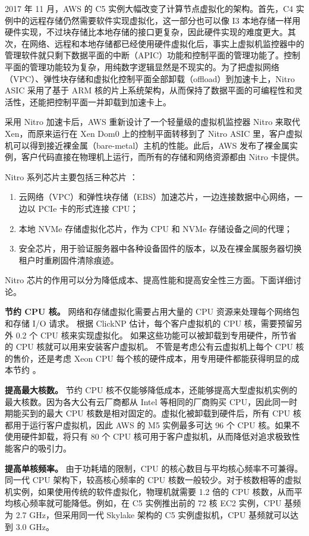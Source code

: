 2017 年 11 月，AWS 的 C5 实例大幅改变了计算节点虚拟化的架构。首先，C4 实例中的远程存储仍然需要软件实现虚拟化，这一部分也可以像 I3 本地存储一样用硬件实现，不过块存储比本地存储的接口更复杂，因此硬件实现的难度更大。其次，在网络、远程和本地存储都已经使用硬件虚拟化后，事实上虚拟机监控器中的管理软件就只剩下数据平面的中断（APIC）功能和控制平面的管理功能了。控制平面的管理功能较为复杂，用纯数字逻辑显然是不现实的。为了把虚拟网络（VPC）、弹性块存储和虚拟化控制平面全部卸载（offload）到加速卡上，Nitro ASIC 采用了基于 ARM 核的片上系统架构，从而保持了数据平面的可编程性和灵活性，还能把控制平面一并卸载到加速卡上。

采用 Nitro 加速卡后，AWS 重新设计了一个轻量级的虚拟机监控器 Nitro 来取代 Xen，而原来运行在 Xen Dom0 上的控制平面转移到了 Nitro ASIC 里，客户虚拟机可以得到接近裸金属（bare-metal）主机的性能。此后，AWS 发布了裸金属实例，客户代码直接在物理机上运行，而所有的存储和网络资源都由 Nitro 卡提供。

Nitro 系列芯片主要包括三种芯片 \cite{nitro-blog,nitro-talk,nitro-web}：
\begin{enumerate}
	\item 云网络（VPC）和弹性块存储（EBS）加速芯片，一边连接数据中心网络，一边以 PCIe 卡的形式连接 CPU；
	\item 本地 NVMe 存储虚拟化芯片，作为 CPU 和 NVMe 存储设备之间的代理；
	\item 安全芯片，用于验证服务器中各种设备固件的版本，以及在裸金属服务器切换租户时重刷固件清除痕迹。
\end{enumerate}

Nitro 芯片的作用可以分为降低成本、提高性能和提高安全性三方面。下面详细讨论。

\textbf{节约 CPU 核。}
网络和存储虚拟化需要占用大量的 CPU 资源来处理每个网络包和存储 I/O 请求。
根据 ClickNP \cite{li2016clicknp} 估计，每个客户虚拟机的 CPU 核，需要预留另外 0.2 个 CPU 核来实现虚拟化。
如果这些功能可以被卸载到专用硬件，所节省的 CPU 核就可以用来安装客户虚拟机。
不管是考虑公有云虚拟机上每个 CPU 核的售价，还是考虑 Xeon CPU 每个核的硬件成本，用专用硬件都能获得明显的成本节约 \cite{smartnic}。

\textbf{提高最大核数。}
节约 CPU 核不仅能够降低成本，还能够提高大型虚拟机实例的最大核数。因为各大公有云厂商都从 Intel 等相同的厂商购买 CPU，因此同一时期能买到的最大 CPU 核数是相对固定的。虚拟化被卸载到硬件后，所有 CPU 核都用于运行客户虚拟机，因此 AWS 的 M5 实例最多可达 96 个 CPU 核。如果不使用硬件卸载，将只有 80 个 CPU 核可用于客户虚拟机，从而降低对追求极致性能客户的吸引力。

\textbf{提高单核频率。}
由于功耗墙的限制，CPU 的核心数目与平均核心频率不可兼得。同一代 CPU 架构下，较高核心频率的 CPU 核数一般较少。对于核数相等的虚拟机实例，如果使用传统的软件虚拟化，物理机就需要 1.2 倍的 CPU 核数，从而平均核心频率就可能降低。例如，在 C5 实例推出前的 72 核 EC2 实例，CPU 基频为 2.7 GHz，但采用同一代 Skylake 架构的 C5 实例虚拟机，CPU 基频就可以达到 3.0 GHz。

